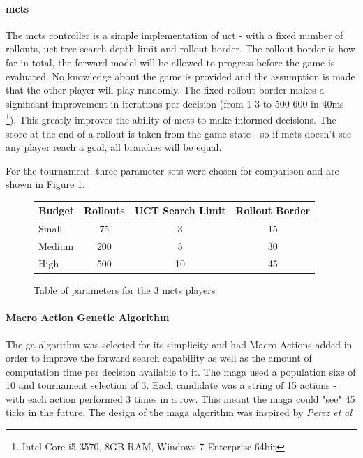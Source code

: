 \documentclass{IEEEtran}
\begin{document}
\paragraph{\gls{mcts}}
The \gls{mcts} controller is a simple implementation of \gls{uct} - with a fixed number of rollouts, \gls{uct} tree search depth limit and rollout border. The rollout border is how far in total, the forward model will be allowed to progress before the game is evaluated. No knowledge about the game is provided and the assumption is made that the other player will play randomly. The fixed rollout border makes a significant improvement in iterations per decision (from 1-3 to 500-600 in 40ms \footnote{Intel Core i5-3570, 8GB RAM, Windows 7 Enterprise 64bit}). This greatly improves the ability of \gls{mcts} to make informed decisions. The score at the end of a rollout is taken from the game state - so if \gls{mcts} doesn't see any player reach a goal, all branches will be equal.

For the tournament, three parameter sets were chosen for comparison and are shown in Figure \ref{mctsTable}.
\begin{figure}[h]
\centering
\begin{tabular}{| l | c | c | c |}
\hline
\textbf{Budget} & \textbf{Rollouts} & \textbf{UCT Search Limit} & \textbf{Rollout Border} \\
\hline
Small & 75 & 3 & 15 \\
Medium & 200 & 5 & 30 \\
High & 500 & 10 & 45 \\
\hline
\end{tabular}
\caption{Table of parameters for the 3 \gls{mcts} players}
\label{mctsTable}
\end{figure}

\paragraph{Macro Action Genetic Algorithm}
The \gls{ga} algorithm was selected for its simplicity and had Macro Actions added in order to improve the forward search capability as well as the amount of computation time per decision available to it. The \gls{maga} used a population size of 10 and tournament selection of 3. Each candidate was a string of 15 actions - with each action performed 3 times in a row. This meant the \gls{maga} could "see" 45 ticks in the future. The design of the \gls{maga} algorithm was inspired by \textit{Perez et al} \cite{perez2013rolling}
\end{document}
